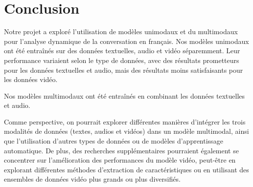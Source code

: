 \documentclass[a4paper]{article}
\begin{document}
\section{Conclusion}

Notre projet a exploré l'utilisation de modèles unimodaux et du multimodaux pour l'analyse dynamique de la conversation en français.
Nos modèles unimodaux ont été entraînés sur des données textuelles, audio et vidéo séparemment. Leur performance variaient selon le type de données, avec des résultats prometteurs pour les données textuelles et audio, mais des résultats moins satisfaisants pour les données vidéo.

Nos modèles multimodaux ont été entraînés en combinant les données textuelles et audio. 


Comme perspective, on pourrait explorer différentes manières d'intégrer les trois modalités de données (textes, audios et vidéos) dans un modèle multimodal, 
ainsi que l'utilisation d'autres types de données ou de modèles d'apprentissage automatique. 
De plus, des recherches supplémentaires pourraient également se concentrer sur l'amélioration des performances du modèle vidéo, 
peut-être en explorant différentes méthodes d'extraction de caractéristiques ou en utilisant des ensembles de données vidéo plus grands ou plus diversifiés.

\bigskip
\printbibliography
\end{document}
